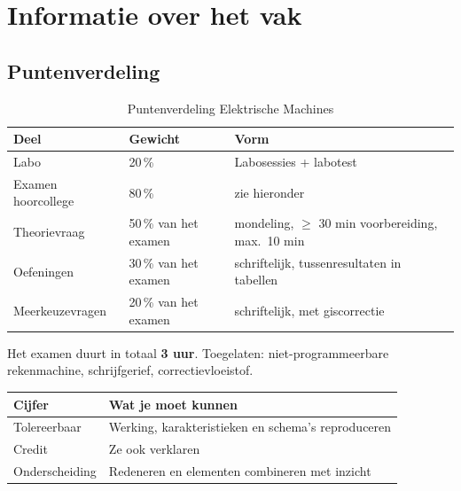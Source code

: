
\chapter{Informatie over het vak}

\section{Puntenverdeling}

\begin{table}[H]
  \centering
  \begin{tabular}{@{}lll@{}}
    \toprule
    \textbf{Deel} & \textbf{Gewicht} & \textbf{Vorm} \\
    \midrule
    Labo & 20\,\% & Labosessies + labotest \\
    Examen hoorcollege & 80\,\% & zie hieronder \\
    \quad Theorievraag & 50\,\% van het examen & mondeling, $\geq$ 30 min voorbereiding, max.\ 10 min \\
    \quad Oefeningen & 30\,\% van het examen & schriftelijk, tussenresultaten in tabellen \\
    \quad Meerkeuzevragen & 20\,\% van het examen & schriftelijk, met giscorrectie \\
    \bottomrule
  \end{tabular}
  \caption{Puntenverdeling Elektrische Machines}
\end{table}


Het examen duurt in totaal \textbf{3 uur}. Toegelaten: niet-programmeerbare rekenmachine,
schrijfgerief, correctievloeistof.

\begin{table}[H]
  \centering
  \begin{tabular}{@{}ll@{}}
    \toprule
    \textbf{Cijfer} & \textbf{Wat je moet kunnen} \\
    \midrule
    Tolereerbaar & Werking, karakteristieken en schema's reproduceren \\
    Credit & Ze ook verklaren \\
    Onderscheiding & Redeneren en elementen combineren met inzicht \\
    \bottomrule
  \end{tabular}
\end{table}

